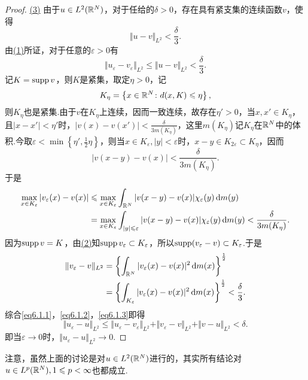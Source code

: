 \begin{proof}
\hyperlink{6.1.1}{(3)}
由于$u\in L^2(\mathbb R^N)$，对于任给的$\delta>0$，存在具有紧支集的连续函数$v$，使得
\begin{equation}\label{eq6.1.1}
	\Vert u-v\Vert_{L^2}<\frac{\delta}{3}.
\end{equation}
由\hyperlink{6.1.1}{(1)}所证，对于任意的$\varepsilon>0$有
\begin{equation}\label{eq6.1.2}
	\Vert u_\varepsilon-v_\varepsilon\Vert_{L^2}\le\Vert u-v\Vert_{L^2}<\frac{\delta}{3}.
\end{equation}
记$K=\operatorname{supp} v$，则$K$是紧集，取定$\eta>0$，记
\[K_\eta=\left\{x\in\mathbb R^N\colon d(x,K)\leqslant\eta\right\},\]
则$K_\eta$也是紧集.由于$v$在$K_\eta$上连续，因而一致连续，故存在$\eta'>0$，当$x,x'\in K_\eta$，且$|x-x'|<\eta'$时，$|v(x)-v(x')|<\frac{\delta}{3m(K_\eta)}$，这里$m(K_\eta)$记$K_\eta$在$\mathbb R^N$中的体积.今取$\varepsilon<\min\left\{\eta',\frac12 \eta\right\}$，则当$x\in K_\varepsilon,|y|<\varepsilon$时，$x-y\in K_{2\varepsilon}\subset K_\eta$，因而
\[|v(x-y)-v(x)|<\frac{\delta}{3m(K_\eta)}.\]
于是
\begin{align*}
	\max_{x\in K_\varepsilon}|v_\varepsilon(x)-v(x)|
	&\leqslant\max_{x\in K_\varepsilon}\int_{\mathbb R^N}|v(x-y)-v(x)|\chi_\varepsilon(y)\mathop{}\!\mathrm{d} m(y)\\
	&=\max_{x\in K_\varepsilon}\int_{|y|\leqslant\varepsilon}|v(x-y)-v(x)|\chi_\varepsilon(y)\mathop{}\!\mathrm{d} m(y)<\frac{\delta}{3m(K_\eta)}.
\end{align*}
因为$\operatorname{supp} v=K$，由\hyperlink{6.1.1}{(2)}知$\operatorname{supp} v_\varepsilon\subset K_\varepsilon$，所以$\operatorname{supp}(v_\varepsilon-v)\subset K_\varepsilon$.于是
\begin{align}\label{eq6.1.3}
	\Vert v_\varepsilon-v\Vert_{L^2}
	&=\left\{\int_{\mathbb R^N}|v_\varepsilon(x)-v(x)|^2\mathop{}\!\mathrm{d} m(x)\right\}^{\frac12}\notag\\
	&=\left\{\int_{K_\varepsilon}|v_\varepsilon(x)-v(x)|^2\mathop{}\!\mathrm{d} m(x)\right\}^{\frac12}<\frac\delta 3.
\end{align}
综合\eqref{eq6.1.1}，\eqref{eq6.1.2}，\eqref{eq6.1.3}即得
\[\Vert u_\varepsilon-u\Vert_{L^2}\le\Vert u_\varepsilon-v_\varepsilon\Vert_{L^2}+\Vert v_\varepsilon-v\Vert_{L^2}+\Vert v-u\Vert_{L^2}<\delta.\]
即当$\varepsilon\to0$时，$\Vert u_\varepsilon-u\Vert_{L^2}\to0$.
\end{proof}
注意，虽然上面的讨论是对$u\in L^2(\mathbb R^N)$进行的，其实所有结论对$u\in L^p(\mathbb R^N),1\leqslant p<\infty$也都成立.
